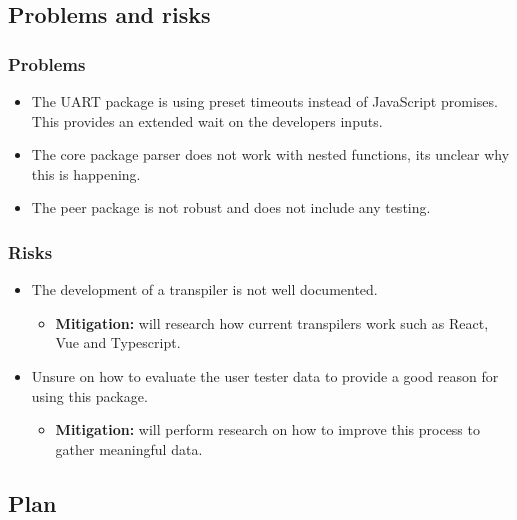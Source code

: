 \documentclass[11pt]{article}
\begin{document}
\subsection{Problems and risks}\label{problems-and-risks}

\subsubsection{Problems}\label{problems}

\begin{itemize}
    \item The UART package is using preset timeouts instead of JavaScript promises. This provides an extended wait on the developers inputs.
    \item The core package parser does not work with nested functions, its unclear why this is happening.
    \item The peer package is not robust and does not include any testing.
\end{itemize}

\subsubsection{Risks}\label{risks}

\begin{itemize}
    \item The development of a transpiler is not well documented. 
    \begin{itemize}
        \item \textbf{Mitigation:} will research how current transpilers work such as React, Vue and Typescript.
    \end{itemize}
    \item Unsure on how to evaluate the user tester data to provide a good reason for using this package. 
    \begin{itemize}
        \item \textbf{Mitigation:} will perform research on how to improve this process to gather meaningful data.
    \end{itemize}
\end{itemize}

\subsection{Plan}\label{plan}
\end{document}
